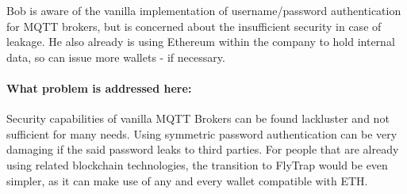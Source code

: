 Bob is aware of the vanilla implementation of username/password authentication for MQTT brokers, but is concerned about the insufficient security in case of leakage. He also already is using Ethereum within the company to hold internal data, so can issue more wallets - if necessary.
\paragraph{\textbf{What problem is addressed here:}}
Security capabilities of vanilla MQTT Brokers can be found lackluster and not sufficient for many needs. Using symmetric password authentication can be very damaging if the said password leaks to third parties. For people that are already using related blockchain technologies, the transition to FlyTrap would be even simpler, as it can make use of any and every wallet compatible with ETH.


